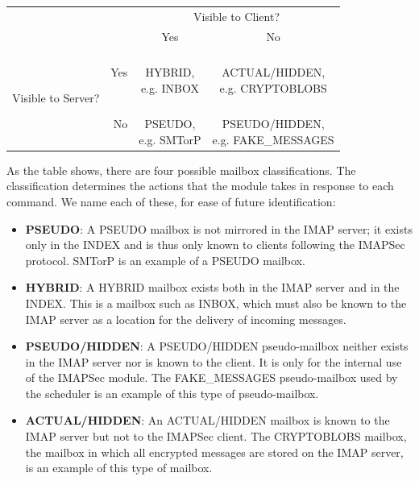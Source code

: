 \documentclass[pageno]{jpaper}
\newcommand{\project}{IMAPSec }
\begin{document}
\begin{center}
\begin{tabular}{ rr|c|c| }

 &\multicolumn{1}{r}{} & \multicolumn{2}{c}{Visible to Client?} \\

&\multicolumn{1}{r}{}
 &  \multicolumn{1}{c}{Yes}
 & \multicolumn{1}{c}{No} \\
\cline{3-4}
\multirow{2}{*}{Visible to Server?} & Yes & \shortstack[c]{\smallskip \\ \smallskip HYBRID,\\ e.g. INBOX} & \shortstack[c]{\smallskip \\ \smallskip ACTUAL/HIDDEN, \\e.g. CRYPTOBLOBS} \\
\cline{3-4}
& No & \shortstack[c]{\smallskip \\ \smallskip PSEUDO,\\ e.g. SMTorP} & \shortstack[c]{\smallskip \\ \smallskip  PSEUDO/HIDDEN,\\e.g. FAKE\_MESSAGES} \\
\cline{3-4}
\end{tabular}
\end{center}

\medskip

As the table shows, there are four possible mailbox classifications. The classification determines the actions that the module takes in response to each command. We name each of these, for ease of future identification:

\begin{itemize}

\item \textbf{PSEUDO}: A PSEUDO mailbox is not mirrored in the IMAP server; it exists only in the INDEX and is thus only known to clients following the \project protocol. SMTorP is an example of a PSEUDO mailbox.
\item \textbf{HYBRID}: A HYBRID mailbox exists both in the IMAP server and in the INDEX. This is a mailbox such as INBOX, which must also be known to the IMAP server as a location for the delivery of incoming messages.
\item \textbf{PSEUDO/HIDDEN}: A PSEUDO/HIDDEN pseudo-mailbox neither exists in the IMAP server nor is known to the client. It is only for the internal use of the \project module. The FAKE\_MESSAGES pseudo-mailbox used by the scheduler is an example of this type of pseudo-mailbox.
\item \textbf{ACTUAL/HIDDEN}: An ACTUAL/HIDDEN mailbox is known to the IMAP server but not to the \project client. The CRYPTOBLOBS mailbox, the mailbox in which all encrypted messages are stored on the IMAP server, is an example of this type of mailbox.

\end{itemize}
\end{document}
